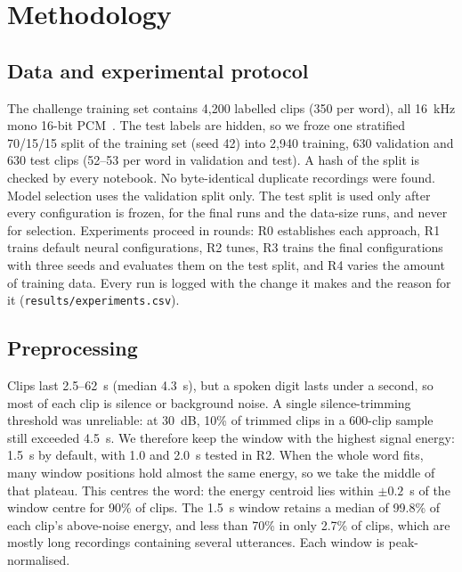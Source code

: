 \section{Methodology}
\label{sec:method}

\subsection{Data and experimental protocol}
The challenge training set contains 4{,}200 labelled clips (350 per word), all 16~kHz mono 16-bit
PCM~\cite{zindi2021swahili}. The test labels are hidden, so we froze one stratified 70/15/15 split of the training
set (seed 42) into 2{,}940 training, 630 validation and 630 test clips (52--53 per word in validation and test). A
hash of the split is checked by every notebook. No byte-identical duplicate recordings were found.
Model selection uses the validation split only. The test split is used only after every configuration is frozen, for
the final runs and the data-size runs, and never for selection.
Experiments proceed in rounds: R0 establishes each approach, R1 trains default neural configurations, R2 tunes, R3
trains the final configurations with three seeds and evaluates them on the test split, and R4 varies the amount of
training data. Every run is logged with the change it makes and the reason for it (\texttt{results/experiments.csv}).

\subsection{Preprocessing}
Clips last 2.5--62~s (median 4.3~s), but a spoken digit lasts under a second, so most of each clip is silence or
background noise. A single silence-trimming threshold was unreliable: at 30~dB, 10\% of trimmed clips in a
600-clip sample still exceeded 4.5~s. We therefore keep the window with the highest signal energy: 1.5~s by default,
with 1.0 and 2.0~s tested in R2. When the whole word fits, many window positions hold almost the same energy, so we
take the middle of that plateau. This centres the word: the energy centroid lies within $\pm0.2$~s of the window
centre for 90\% of clips. The 1.5~s window retains a median of
99.8\% of each clip's above-noise energy, and less than 70\% in only 2.7\% of clips, which are mostly long
recordings containing several utterances. Each window is peak-normalised.

